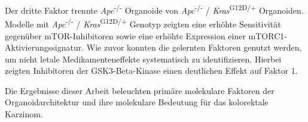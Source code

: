 Der dritte Faktor trennte \textit{Apc}\textsuperscript{-/-} Organoide von \textit{Apc}\textsuperscript{-/-} / \textit{Kras}\textsuperscript{G12D/+} Organoiden. Modelle mit  \textit{Apc}\textsuperscript{-/-} / \textit{Kras}\textsuperscript{G12D/+} Genotyp zeigten eine erhöhte Sensitivität gegenüber mTOR-Inhibitoren sowie eine erhöhte Expression einer mTORC1-Aktivierungssignatur.
Wie zuvor konnten die gelernten Faktoren genutzt werden, um nicht letale Medikamenteneffekte systematisch zu identifizieren. Hierbei zeigten Inhibitoren der GSK3-Beta-Kinase einen deutlichen Effekt auf Faktor 1.
\bigbreak

Die Ergebnisse dieser Arbeit beleuchten primäre molekulare Faktoren der Organoidarchitektur und ihre molekulare Bedeutung für das kolorektale Karzinom.
